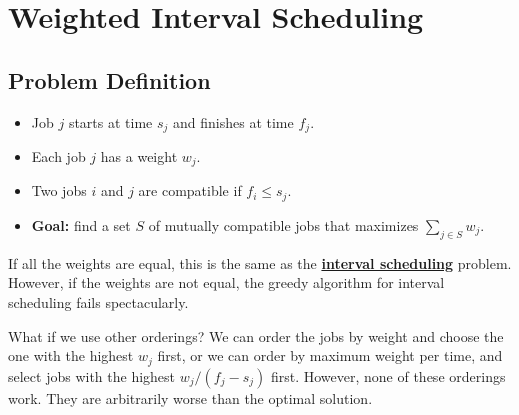 \section{Weighted Interval Scheduling}

\subsection{Problem Definition}

\begin{itemize}
    \item Job $j$ starts at time $s_j$ and finishes at time $f_j$.
    \item Each job $j$ has a weight $w_j$.
    \item Two jobs $i$ and $j$ are compatible if $f_i \leq s_j$.
    \item \textbf{Goal:} find a set $S$ of mutually compatible jobs that maximizes $\sum_{j \in S} w_j$.
\end{itemize}

If all the weights are equal, this is the same as the \hyperref[sec:interval-scheduling]{\textbf{interval scheduling}} problem. However, if the weights are not equal, the greedy algorithm for interval scheduling fails spectacularly.

\begin{center}
    \tikzexternalenable
    \tikzexternaldisable
\end{center}

What if we use other orderings? We can order the jobs by weight and choose the one with the highest $w_j$ first, or we can order by maximum weight per time, and select jobs with the highest $w_j / (f_j - s_j)$ first. However, none of these orderings work. They are arbitrarily worse than the optimal solution. 

